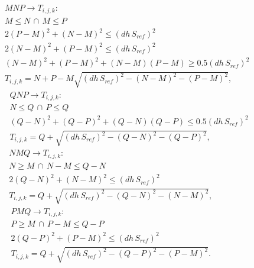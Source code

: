\begin{multline}
	MNP \to T_{i,j,k}: \\ 
	M \le N \,\cap\, M \le P \\
	2(P-M)^2 + (N-M)^2 \le (dh\,S_{ref})^2 \\
	2(N-M)^2 + (P-M)^2 \le (dh\,S_{ref})^2 \\
	(N-M)^2 + (P-M)^2 + (N-M)(P-M) \ge 0.5(dh\,S_{ref})^2 \\
	T_{i,j,k} = N + P - M \sqrt{(dh\,S_{ref})^2 - (N-M)^2 - (P-M)^2}, \,\,\,\,\,\,\,\,\,\,\,\,\,\,\,\,\,\,\,\,\,
	\label{MNP-R}
\end{multline}
\begin{multline}
	QNP \to T_{i,j,k}: \\	
	N \le Q \,\cap\, P \le Q \\
	(Q-N)^2 + (Q-P)^2 + (Q-N)(Q-P) \le 0.5(dh\,S_{ref})^2 \\
	T_{i,j,k} = Q + \sqrt{(dh\,S_{ref})^2 - (Q-N)^2 - (Q-P)^2}, \,\,\,\,\,\,\,\,\,\,\,\,\,\,\,\,\,\,\,\,\,\,\,\,\,\,\,\,\,\,\,\,\,   
	\label{QNP-R}
\end{multline}
\begin{multline}
	NMQ \to T_{i,j,k}: \\	
	N \ge M \,\cap\, N-M \le Q-N \\
	2(Q-N)^2 + (N-M)^2 \le (dh\,S_{ref})^2 \\
	T_{i,j,k} = Q + \sqrt{(dh\,S_{ref})^2 - (Q-N)^2 - (N-M)^2}, \,\,\,\,\,\,\,\,\,\,\,\,\,\,\,\,\,\,\,\,\,\,\,\,\,\,\,\,\,\,\,\,
	\label{NMQ-R}
\end{multline}
\begin{multline}
	PMQ \to T_{i,j,k}: \\	
	P \ge M \,\cap\, P-M \le Q-P \\
	2(Q-P)^2 + (P-M)^2 \le (dh\,S_{ref})^2 \\
	T_{i,j,k} = Q + \sqrt{(dh\,S_{ref})^2 - (Q-P)^2 - (P-M)^2}. \,\,\,\,\,\,\,\,\,\,\,\,\,\,\,\,\,\,\,\,\,\,\,\,\,\,\,\,\,\,\,\,
	\label{PMQ-R}
\end{multline}


